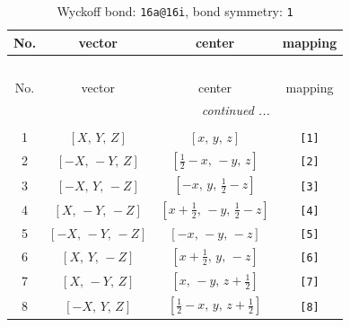 \documentclass[fleqn,8pt]{jsarticle}
\begin{document}
\begin{longtable}{cccc}
\caption{Wyckoff bond: {\tt 16a@16i}, bond symmetry: {\tt 1}}
 \\
 \hline \hline
No. & vector & center & mapping \\ \hline \endfirsthead

\multicolumn{3}{l}{\tablename\ \thetable{}} \\
 \hline \hline
No. & vector & center & mapping \\ \hline \endhead

 \hline \hline
\multicolumn{3}{r}{\footnotesize\it continued ...} \\ \endfoot

 \hline \hline
\multicolumn{3}{r}{} \\ \endlastfoot

1 & $\left[ X,\, Y,\, Z \right]$ & $\left[ x,\, y,\, z \right]$ & {\tt [1]} \\ \hline
2 & $\left[ - X,\, - Y,\, Z \right]$ & $\left[ \frac{1}{2} - x,\, - y,\, z \right]$ & {\tt [2]} \\ \hline
3 & $\left[ - X,\, Y,\, - Z \right]$ & $\left[ - x,\, y,\, \frac{1}{2} - z \right]$ & {\tt [3]} \\ \hline
4 & $\left[ X,\, - Y,\, - Z \right]$ & $\left[ x + \frac{1}{2},\, - y,\, \frac{1}{2} - z \right]$ & {\tt [4]} \\ \hline
5 & $\left[ - X,\, - Y,\, - Z \right]$ & $\left[ - x,\, - y,\, - z \right]$ & {\tt [5]} \\ \hline
6 & $\left[ X,\, Y,\, - Z \right]$ & $\left[ x + \frac{1}{2},\, y,\, - z \right]$ & {\tt [6]} \\ \hline
7 & $\left[ X,\, - Y,\, Z \right]$ & $\left[ x,\, - y,\, z + \frac{1}{2} \right]$ & {\tt [7]} \\ \hline
8 & $\left[ - X,\, Y,\, Z \right]$ & $\left[ \frac{1}{2} - x,\, y,\, z + \frac{1}{2} \right]$ & {\tt [8]} \\
\end{longtable}
\end{document}
